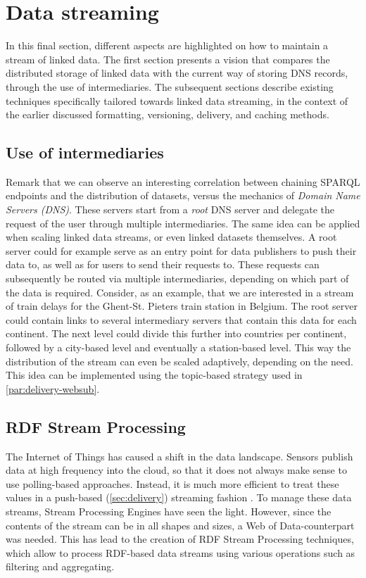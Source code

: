 \section{Data streaming}
In this final section, different aspects are highlighted on how to maintain a stream of linked data. The first section presents a vision that compares the distributed storage of linked data with the current way of storing DNS records, through the use of intermediaries. The subsequent sections describe existing techniques specifically tailored towards linked data streaming, in the context of the earlier discussed formatting, versioning, delivery, and caching methods.

\subsection{Use of intermediaries}
Remark that we can observe an interesting correlation between chaining SPARQL endpoints and the distribution of datasets, versus the mechanics of \emph{Domain Name Servers (DNS)}. These servers start from a \emph{root} DNS server and delegate the request of the user through multiple intermediaries. The same idea can be applied when scaling linked data streams, or even linked datasets themselves. A root server could for example serve as an entry point for data publishers to push their data to, as well as for users to send their requests to. These requests can subsequently be routed via multiple intermediaries, depending on which part of the data is required. Consider, as an example, that we are interested in a stream of train delays for the Ghent-St. Pieters train station in Belgium. The root server could contain links to several intermediary servers that contain this data for each continent. The next level could divide this further into countries per continent, followed by a city-based level and eventually a station-based level. This way the distribution of the stream can even be scaled adaptively, depending on the need. This idea can be implemented using the topic-based strategy used in \cref{par:delivery-websub}.

\subsection{RDF Stream Processing}
The Internet of Things has caused a shift in the data landscape. Sensors publish data at high frequency into the cloud, so that it does not always make sense to use polling-based approaches. Instead, it is much more efficient to treat these values in a push-based (\cref{sec:delivery}) streaming fashion \cite{webofdatastreams}. To manage these data streams, Stream Processing Engines have seen the light. However, since the contents of the stream can be in all shapes and sizes, a Web of Data-counterpart was needed. This has lead to the creation of RDF Stream Processing techniques, which allow to process RDF-based data streams using various operations such as filtering and aggregating.

